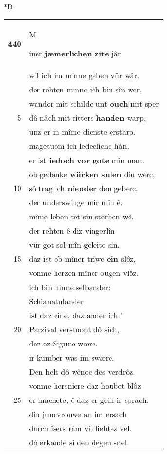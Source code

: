 \documentclass[8pt,a4paper,notitlepage]{article}
\begin{document}
\begin{table}[ht]
\begin{minipage}[t]{0.5\linewidth}
\small
\begin{center}*D
\end{center}
\begin{tabular}{rl}
\textbf{440} & \begin{large}M\end{large}îner \textbf{jæmerlîchen zîte} jâr\\ 
 & wil ich im minne geben vür wâr.\\ 
 & der rehten minne ich bin sîn wer,\\ 
 & wander mit schilde unt \textbf{ouch} mit sper\\ 
5 & dâ nâch mit ritters \textbf{handen} warp,\\ 
 & unz er in mîme dienste erstarp.\\ 
 & magetuom ich ledeclîche hân.\\ 
 & er ist \textbf{iedoch vor gote} mîn man.\\ 
 & ob gedanke \textbf{würken sulen} diu werc,\\ 
10 & sô trag ich \textbf{niender} den geberc,\\ 
 & der underswinge mir mîn ê.\\ 
 & mîme leben tet sîn sterben wê.\\ 
 & der rehten ê diz vingerlîn\\ 
 & vür got sol mîn geleite sîn.\\ 
15 & daz ist ob mîner triwe \textbf{ein} slôz,\\ 
 & vonme herzen mîner ougen vlôz.\\ 
 & ich bin hinne selbander:\\ 
 & Schianatulander\\ 
 & ist daz eine, daz ander ich."\\ 
20 & Parzival verstuont dô sich,\\ 
 & daz ez Sigune wære.\\ 
 & ir kumber was im swære.\\ 
 & Den helt dô wênec des verdrôz.\\ 
 & vonme hersniere daz houbet blôz\\ 
25 & er machete, ê daz er gein ir sprach.\\ 
 & diu juncvrouwe an im ersach\\ 
 & durch îsers râm vil liehtez vel.\\ 
 & dô erkande si den degen snel.\\ 

\end{tabular}
\end{minipage}
\end{table}
\end{document}
